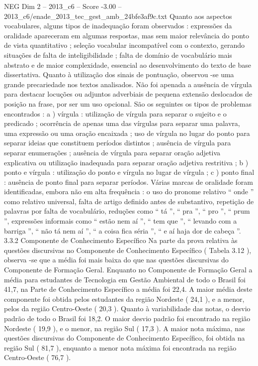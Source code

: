 \begin{textsample}{NEG Dim 2 – 2013\_c6 – Score -3.00 – 2013\_c6/enade\_2013\_tec\_gest\_amb\_24bfe3af9c.txt}
Quanto aos aspectos vocabulares, alguns tipos de inadequação foram observados : expressões da oralidade apareceram em algumas respostas, mas sem maior relevância do ponto de vista quantitativo ; seleção vocabular incompatível com o contexto, gerando situações de falta de inteligibilidade ; falta de domínio de vocabulário mais abstrato e de maior complexidade, essencial ao desenvolvimento do texto de base dissertativa.
Quanto à utilização dos sinais de pontuação, observou -se uma grande precariedade nos textos analisados.
Não foi apenada a ausência de vírgula para destacar locuções ou adjuntos adverbiais de pequena extensão deslocados de posição na frase, por ser um uso opcional.
São os seguintes os tipos de problemas encontrados : a ) vírgula : utilização de vírgula para separar o sujeito e o predicado ; ocorrência de apenas uma das vírgulas para separar uma palavra, uma expressão ou uma oração encaixada ; uso de vírgula no lugar do ponto para separar ideias que constituem períodos distintos ; ausência de vírgula para separar enumerações ; ausência de vírgula para separar oração adjetiva explicativa ou utilização inadequada para separar oração adjetiva restritiva ; b ) ponto e vírgula : utilização do ponto e vírgula no lugar de vírgula ; c ) ponto final : ausência de ponto final para separar períodos.
Várias marcas de oralidade foram identificadas, embora não em alta frequência : o uso do pronome relativo “ onde ” como relativo universal, falta de artigo definido antes de substantivo, repetição de palavras por falta de vocabulário, reduções como “ tá ”, “ pra ”, “ pro ”, “ prum ”, expressões informais como “ estão nem aí ”, “ tem que ”, “ levando com a barriga ”, “ não tá nem aí ”, “ a coisa fica séria ”, “ e aí haja dor de cabeça ”. 3.3.2 Componente de Conhecimento Específico Na parte da prova relativa às questões discursivas no Componente de Conhecimento Específico ( Tabela 3.12 ), observa -se que a média foi mais baixa do que nas questões discursivas do Componente de Formação Geral.
Enquanto no Componente de Formação Geral a média para estudantes de Tecnologia em Gestão Ambiental de todo o Brasil foi 41,7, na Parte de Conhecimento Específico a média foi 22,4.
A maior média deste componente foi obtida pelos estudantes da região Nordeste ( 24,1 ), e a menor, pelos da região Centro-Oeste ( 20,3 ).
Quanto à variabilidade das notas, o desvio padrão de todo o Brasil foi 18,2.
O maior desvio padrão foi encontrado na região Nordeste ( 19,9 ), e o menor, na região Sul ( 17,3 ).
A maior nota máxima, nas questões discursivas do Componente de Conhecimento Específico, foi obtida na região Sul ( 81,7 ), enquanto a menor nota máxima foi encontrada na região Centro-Oeste ( 76,7 ).

\end{textsample}
